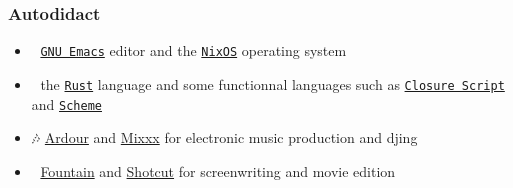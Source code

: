\documentclass[11pt]{article}
\begin{document}
\subsubsection{Autodidact}
\label{sec:orgebc2350}
\begin{itemize}
\item 🐄 \href{https://www.gnu.org/software/emacs/}{\texttt{GNU Emacs}} editor and the \href{https://nixos.org/}{\texttt{NixOS}} operating system
\item 🦀 the \href{https://www.rust-lang.org/}{\texttt{Rust}} language and some functionnal languages such as \href{https://clojurescript.org/}{\texttt{Closure Script}} and \href{http://www.call-cc.org/}{\texttt{Scheme}}
\item 🎶 \href{https://ardour.org/}{Ardour} and \href{https://mixxx.org/}{Mixxx} for electronic music production and djing
\item 🎥 \href{https://fountain.io/}{Fountain} and \href{https://www.shotcut.org/}{Shotcut} for screenwriting and movie edition
\end{itemize}
\end{document}
